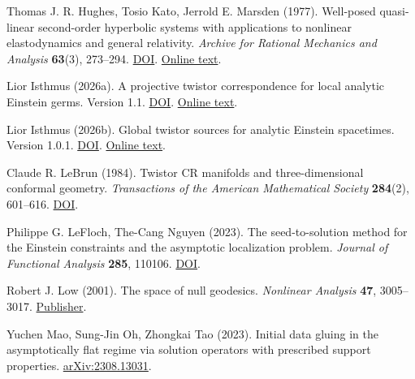 \documentclass[
  english,
  11pt,
  reqno]{amsart}
\begin{document}
\begin{thebibliography}{}
\leavevmode{}\label{ref-HughesKatoMarsden1977}Thomas J. R. Hughes, Tosio Kato, Jerrold E. Marsden (1977). Well-posed
quasi-linear second-order hyperbolic systems with applications to
nonlinear elastodynamics and general relativity. \emph{Archive for
Rational Mechanics and Analysis} \textbf{63}(3), 273--294.
\href{https://doi.org/10.1007/BF00251584}{DOI}.
\href{https://www.cds.caltech.edu/~marsden/bib/1977/02-HuKaMa1977/HuKaMa1977.pdf}{Online
text}.

\leavevmode{}\label{ref-IsthmusLocal2026}Lior Isthmus (2026a). A projective twistor correspondence for local
analytic Einstein germs. Version 1.1.
\href{https://doi.org/10.5281/zenodo.24197319}{DOI}.
\href{https://hexagonmath.org/2611.00123v2}{Online text}.

\leavevmode{}\label{ref-IsthmusGlobal2026}Lior Isthmus (2026b). Global twistor sources for analytic Einstein
spacetimes. Version 1.0.1.
\href{https://doi.org/10.5281/zenodo.24239028}{DOI}.
\href{https://hexagonmath.org/2611.00425v2}{Online text}.

\leavevmode{}\label{ref-LeBrun1984}Claude R. LeBrun (1984). Twistor CR manifolds and three-dimensional
conformal geometry. \emph{Transactions of the American Mathematical
Society} \textbf{284}(2), 601--616.
\href{https://doi.org/10.1090/S0002-9947-1984-0743735-9}{DOI}.

\leavevmode{}\label{ref-LeFlochNguyen2023}Philippe G. LeFloch, The-Cang Nguyen (2023). The seed-to-solution method
for the Einstein constraints and the asymptotic localization problem.
\emph{Journal of Functional Analysis} \textbf{285}, 110106.
\href{https://doi.org/10.1016/j.jfa.2023.110106}{DOI}.

\leavevmode{}\label{ref-Low2001}Robert J. Low (2001). The space of null geodesics. \emph{Nonlinear
Analysis} \textbf{47}, 3005--3017.
\href{https://www.sciencedirect.com/science/article/abs/pii/S0362546X01004217}{Publisher}.

\leavevmode{}\label{ref-MaoOhTao2023}Yuchen Mao, Sung-Jin Oh, Zhongkai Tao (2023). Initial data gluing in the
asymptotically flat regime via solution operators with prescribed
support properties.
\href{https://arxiv.org/abs/2308.13031}{arXiv:2308.13031}.


\end{thebibliography}
\end{document}
